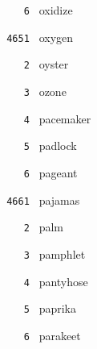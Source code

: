 \documentclass[11pt]{article}
\begin{document}
\begin{multicols}{6}
\noindent \texttt{ \ \ \ 6 } oxidize  \par
\vspace{3mm}
\noindent \texttt{ 4651 } oxygen  \par
\noindent \texttt{ \ \ \ 2 } oyster  \par
\noindent \texttt{ \ \ \ 3 } ozone  \par
\noindent \texttt{ \ \ \ 4 } pacemaker  \par
\noindent \texttt{ \ \ \ 5 } padlock  \par
\noindent \texttt{ \ \ \ 6 } pageant  \par
\vspace{3mm}
\noindent \texttt{ 4661 } pajamas  \par
\noindent \texttt{ \ \ \ 2 } palm  \par
\noindent \texttt{ \ \ \ 3 } pamphlet  \par
\noindent \texttt{ \ \ \ 4 } pantyhose  \par
\noindent \texttt{ \ \ \ 5 } paprika  \par
\noindent \texttt{ \ \ \ 6 } parakeet  \par
\end{multicols}
\end{document}
